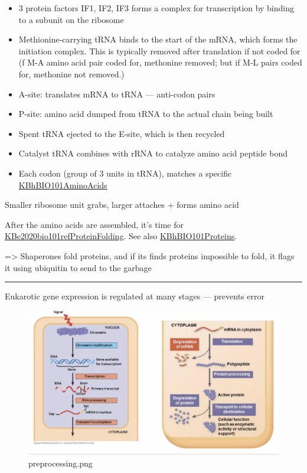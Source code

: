 \documentclass[letterpaper]{article}
\begin{document}
\begin{itemize}
\item 3 protein factors IF1, IF2, IF3 forms a complex for transcription by
binding to a subunit on the ribosome
\item Methionine-carrying tRNA binds to the start of the mRNA, which forms
the initiation complex. This is typically removed after translation if
not coded for (f M-A amino acid pair coded for, methonine removed; but
if M-L pairs coded for, methonine not removed.)
\item A-site: translates mRNA to tRNA --- anti-codon pairs
\item P-site: amino acid dumped from tRNA to the actual chain being built
\item Spent tRNA ejected to the E-site, which is then recycled
\item Catalyst tRNA combines with rRNA to catalyze amino acid peptide bond
\item Each codon (group of 3 units in tRNA), matches a specific
\href{KBhBIO101AminoAcids.org}{KBhBIO101AminoAcids}
\end{itemize}

Smaller ribosome unit grabs, larger attaches + forms amino acid

After the amino acids are assembled, it's time for
\href{KBe2020bio101refProteinFolding.org}{KBe2020bio101refProteinFolding}.
See also \href{KBhBIO101Proteins.org}{KBhBIO101Proteins}.

=> Shaperones fold proteins, and if its finds proteins impossible to
fold, it flags it using ubiquitin to send to the garbage

\noindent\rule{\textwidth}{0.5pt}

Eukarotic gene expression is regulated at many stages --- prevents error

\begin{figure}[htbp]
\centering
\includegraphics[width=.9\linewidth]{preprocessing.png}
\caption{preprocessing.png}
\end{figure}
\end{document}
